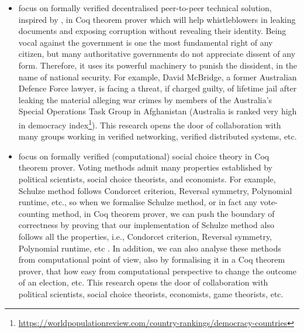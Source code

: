 \documentclass[a4paper]{article}
\begin{document}
\begin{itemize}
\item focus on formally verified decentralised peer-to-peer technical solution, inspired by 
\cite{liu2004linkable, noether2015ring}, in Coq theorem prover which will help 
whistleblowers in leaking documents and exposing 
corruption without revealing their identity. 
Being vocal against the government is one the most fundamental right of any citizen, but many 
authoritative governments do not appreciate dissent of any form. Therefore, it uses 
its powerful machinery to punish the dissident, in the name of national security. For example,
David McBridge, a former Australian Defence Force lawyer,  
is facing a threat, if charged guilty, of lifetime jail after
leaking the material alleging war crimes by members of the Australia's Special Operations
Task Group in Afghanistan (Australia is ranked very high in 
democracy index\footnote{\url{https://worldpopulationreview.com/country-rankings/democracy-countries}}). 
This research opens the door of collaboration with many groups working in verified 
networking, verified distributed systems, etc. 



\item focus on formally verified (computational) social choice theory in Coq theorem prover. 
	Voting methods admit many properties established by political scientists, social choice theorists, 
	and economists. For example, Schulze method follows Condorcet criterion, Reversal symmetry,
	Polynomial runtime, etc., so when we formalise Schulze method, or in fact any vote-counting method,
	in Coq theorem prover, we can push the boundary of correctness by proving that our 
	implementation of Schulze method also follows all the properties, i.e.,  Condorcet criterion, Reversal symmetry,
	Polynomial runtime, etc  \cite{tiwari2021machine}. 
	In addition, we can also analyse these 
	methods from computational point of view, also by formalising it in a Coq theorem prover, 
	that how easy from computational perspective to change the outcome of an election, etc. 
	This research opens the door of collaboration with political scientists, 
	social choice theorists, economists, game theorists, etc. 

	


\end{itemize}
\end{document}
